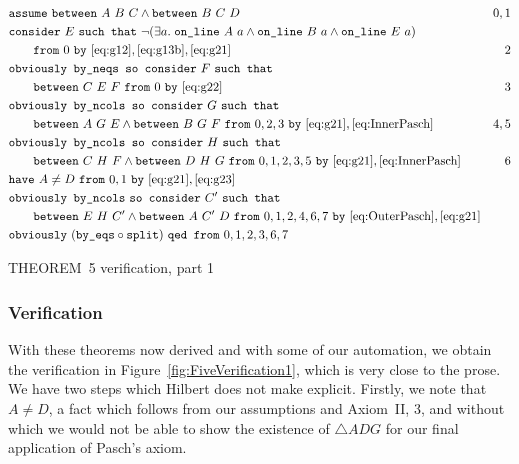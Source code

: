 \begin{boxedfigure}
\small
  \begin{align*}
    &\code{assume}\ \between{A}{B}{C} \wedge \between{B}{C}{D} & 0,1\\
    &\code{consider}\ E\ \code{such that}\ \Triangle{a}{A}{B}{E}\\
    &\qquad\code{from}\ 0\ \code{by}\ \eqref{eq:g12},\eqref{eq:g13b},\eqref{eq:g21} & 2\\
    &\code{obviously by\_neqs so consider}\ F\ \code{such that}\\
    &\qquad\between{C}{E}{F}\ \code{from}\ 0\ \code{by}\ \eqref{eq:g22} & 3\\
    &\code{obviously by\_ncols so consider}\ G\ \code{such that}\\ 
    &\qquad\between{A}{G}{E} \wedge \between{B}{G}{F}\ \code{from}\ 0,2,3\ \code{by}\
    \eqref{eq:g21},\eqref{eq:InnerPasch}& 4,5\\    
    &\code{obviously by\_ncols so consider}\ H\ \code{such that}\\ 
    &\qquad\between{C}{H}{F} \wedge \between{D}{H}{G}\ \code{from}\ 0,1,2,3,5\ \code{by}\ \eqref{eq:g21},\eqref{eq:InnerPasch}& 6\\
    &\code{have}\ A\neq D\ \code{from}\ 0,1\ \code{by}\ \eqref{eq:g21},\eqref{eq:g23}\\
    &\code{obviously by\_ncols}\ \code{so consider}\ C'\ \code{such that}\\
    &\qquad\between{E}{H}{C'}\wedge\between{A}{C'}{D}\ \code{from}\ 0,1,2,4,6,7\ \code{by}\ \eqref{eq:OuterPasch},\eqref{eq:g21}\\
    &\code{obviously}\ (\code{by\_eqs}\circ\code{split})\ \code{qed from}\ 0,1,2,3,6,7
  \end{align*}
  \caption{THEOREM~5 verification, part 1}
  \label{fig:FiveVerification1}
\end{boxedfigure}

\subsubsection{Verification}
With these theorems now derived and with some of our automation, we obtain the verification in Figure~\ref{fig:FiveVerification1}, which is very close to the prose. We have two steps which Hilbert does not make explicit. Firstly, we note that $A\neq D$, a fact which follows from our assumptions and Axiom~II, 3, and without which we would not be able to show the existence of $\triangle ADG$ for our final application of Pasch's axiom.

